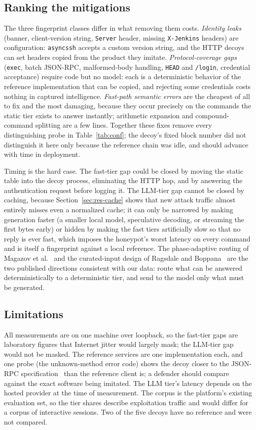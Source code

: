 \documentclass[conference]{IEEEtran}
\begin{document}
\subsection{Ranking the mitigations}
The three fingerprint classes differ in what removing them costs. \emph{Identity leaks} (banner, client-version string, \texttt{Server} header, missing \texttt{X-Jenkins} headers) are configuration: \texttt{asyncssh} accepts a custom version string, and the HTTP decoys can set headers copied from the product they imitate. \emph{Protocol-coverage gaps} (\texttt{exec}, batch JSON-RPC, malformed-body handling, \texttt{HEAD} and \texttt{/login}, credential acceptance) require code but no model: each is a deterministic behavior of the reference implementation that can be copied, and rejecting some credentials costs nothing in captured intelligence. \emph{Fast-path semantic errors} are the cheapest of all to fix and the most damaging, because they occur precisely on the commands the static tier exists to answer instantly; arithmetic expansion and compound-command splitting are a few lines. Together these fixes remove every distinguishing probe in Table~\ref{tab:conf}; the decoy's fixed block number did not distinguish it here only because the reference chain was idle, and should advance with time in deployment.

Timing is the hard case. The fast-tier gap could be closed by moving the static table into the decoy process, eliminating the HTTP hop, and by answering the authentication request before logging it. The LLM-tier gap cannot be closed by caching, because Section~\ref{sec:res-cache} shows that new attack traffic almost entirely misses even a normalized cache; it can only be narrowed by making generation faster (a smaller local model, speculative decoding, or streaming the first bytes early) or hidden by making the fast tiers artificially slow so that no reply is ever fast, which imposes the honeypot's worst latency on every command and is itself a fingerprint against a local reference. The phase-adaptive routing of Magazov et al.~\cite{ref11} and the curated-input design of Ragsdale and Boppana~\cite{ref6} are the two published directions consistent with our data: route what can be answered deterministically to a deterministic tier, and send to the model only what must be generated.

\subsection{Limitations}
All measurements are on one machine over loopback, so the fast-tier gaps are laboratory figures that Internet jitter would largely mask; the LLM-tier gap would not be masked. The reference services are one implementation each, and one probe (the unknown-method error code) shows the decoy closer to the JSON-RPC specification~\cite{ref13} than the reference client is; a defender should compare against the exact software being imitated. The LLM tier's latency depends on the hosted provider at the time of measurement. The corpus is the platform's existing evaluation set, so the tier shares describe exploitation traffic and would differ for a corpus of interactive sessions. Two of the five decoys have no reference and were not compared.
\end{document}
